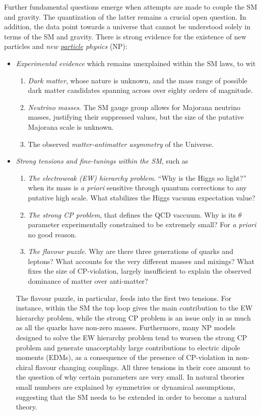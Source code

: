 \documentclass[../report.tex]{subfiles}
\begin{document}
Further fundamental questions emerge when attempts are made to 
couple the SM and gravity. The quantization of the latter remains a crucial open question. In addition, the data 
 point towards a universe that cannot be understood solely in terms of the SM and gravity. 
There is strong evidence  for the existence of new particles and {\it new \underline{particle} physics} (NP): 
\begin{itemize}
    \item {\it Experimental evidence} which remains unexplained within the SM laws, to wit 
    \begin{enumerate}
        \item {\it Dark matter}, whose nature is unknown, and the mass range of possible dark matter candidates spanning across over eighty orders of magnitude. 
        \item {\it Neutrino masses}. The SM gauge group allows for Majorana neutrino masses, justifying their suppressed values, but the size of the putative Majorana
 scale is unknown.
        \item The observed {\it matter-antimatter asymmetry} of the Universe. 
    \end{enumerate}
    
   \vspace{0.2cm}
    
    \item {\it Strong tensions and fine-tunings within the SM}, such as   
    \begin{enumerate}
        \item {\it The electroweak (EW) hierarchy problem}. ``Why is the Higgs so light?''  when its mass is {\it a priori} sensitive through quantum corrections to any putative high scale.  What stabilizes  the Higgs vacuum expectation value? 
        \item {\it The strong CP problem}, that defines the QCD vaccuum.  Why is its $\theta$ parameter experimentally constrained to be extremely small? For {\it a priori} no good reason.
        \item {\it The flavour puzzle}. Why are there three generations of quarks and leptons? What accounts for the very different masses and mixings? What fixes the  
        size of CP-violation, largely insufficient to explain the observed dominance of matter over anti-matter?
    \end{enumerate}
     The flavour puzzle, in particular, feeds into the first two tensions. For instance, within the SM the top loop gives the main contribution to the EW hierarchy problem, while the strong CP problem is an issue only in as much as all the quarks have non-zero masses. Furthermore, many NP models designed to solve the EW hierarchy problem tend to worsen the strong CP problem and generate unacceptably large contributions to electric dipole moments (EDMs), 
    as a consequence
    of the presence of CP-violation in  non-chiral flavour changing couplings.  
      All three tensions in their core amount 
 to the question of why certain parameters are very small. 
 In natural theories small numbers are explained by  symmetries or dynamical assumptions, suggesting that the SM needs to be extended in order to become a natural theory. 
      \end{itemize} 
\end{document}

